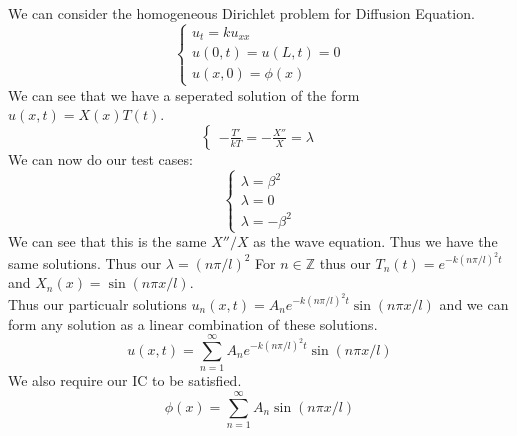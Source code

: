 \documentclass[answers,12pt,addpoints]{exam}
\begin{document}
\begin{definition}
    We can consider the homogeneous Dirichlet problem for Diffusion Equation.
    $$ \begin{cases}
        u_t = ku_{xx} \\
        u(0,t) = u(L,t) = 0 \\
        u(x,0) = \phi(x)
    \end{cases}$$
    We can see that we have a seperated solution of the form $u(x,t) = X(x)T(t)$.\\
    $$ \begin{cases}
        -\frac{T'}{kT} = -\frac{X''}{X} = \lambda
    \end{cases}
    $$
    We can now do our test cases: \\
    $$\begin{cases}
        \lambda = \beta^2 \\
        \lambda = 0 \\
        \lambda = -\beta^2
    \end{cases}$$
    We can see that this is the same $X''/X$ as the wave equation. Thus we have the same solutions.
    Thus our $\lambda = (n\pi/l)^2$ For $n \in \mathbb{Z}$ thus our $T_n(t) = e^{-k(n\pi/l)^2 t}$ and $X_n(x) = \sin(n\pi x/l)$.\\
    Thus our particualr solutions $u_n(x,t) = A_n e^{-k(n\pi/l)^2 t} \sin(n\pi x/l)$ and we can form any solution as a linear combination of these solutions.
    $$ u(x,t) = \sum_{n=1}^\infty A_n e^{-k(n\pi/l)^2 t} \sin(n\pi x/l)$$
    We also require our IC to be satisfied.
    $$ \phi(x) = \sum_{n=1}^\infty A_n \sin(n\pi x/l)$$
\end{definition}
\end{document}
